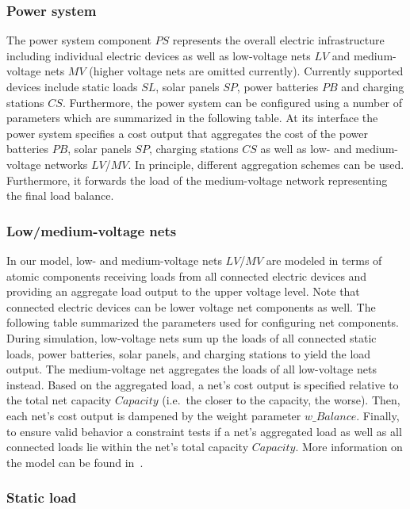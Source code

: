 \subsubsection*{Power system}

The power system component $PS$ represents the overall electric infrastructure including individual electric devices as well as low-voltage nets $LV$ and medium-voltage nets $MV$ (higher voltage nets are omitted currently). Currently supported devices include static loads $SL$, solar panels $SP$, power batteries $PB$ and charging stations $CS$. Furthermore, the power system can be configured using a number of parameters which are summarized in the following table. At its interface the power system specifies a cost output that aggregates the cost of the power batteries $PB$, solar panels $SP$, charging stations $CS$ as well as low- and medium-voltage networks $LV$/$MV$. In principle, different aggregation schemes can be used. Furthermore, it forwards the load of the medium-voltage network representing the final load balance.

\subsubsection*{Low/medium-voltage nets}

In our model, low- and medium-voltage nets $LV$/$MV$ are modeled in terms of atomic components receiving loads from all connected electric devices and providing an aggregate load output to the upper voltage level. Note that connected electric devices can be lower voltage net components as well. The following table summarized the parameters used for configuring net components. During simulation, low-voltage nets sum up the loads of all connected static loads, power batteries, solar panels, and charging stations to yield the load output. The medium-voltage net aggregates the loads of all low-voltage nets instead. Based on the aggregated load, a net's cost output is specified relative to the total net capacity $Capacity$ (i.e.\ the closer to the capacity, the worse). Then, each net's cost output is dampened by the weight parameter $w\_Balance$. Finally, to ensure valid behavior a constraint tests if a net's aggregated load as well as all connected loads lie within the net's total capacity $Capacity$. More information on the model can be found in~\cite{hackenberg2012applying}.

\subsubsection*{Static load}

